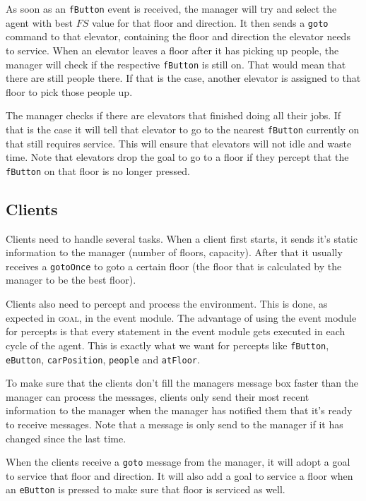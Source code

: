 \documentclass[a4paper,10pt,twocolumn]{article}
\begin{document}
As soon as an \texttt{fButton} event is received, the manager will try and select the agent with best $FS$ value for that floor and direction. It then sends a \texttt{goto} command to that elevator, containing the floor and direction the elevator needs to service. When an elevator leaves a floor after it has picking up people, the manager will check if the respective \texttt{fButton} is still on. That would mean that there are still people there. If that is the case, another elevator is assigned to that floor to pick those people up.

The manager checks if there are elevators that finished doing all their jobs. If that is the case it will tell that elevator to go to the nearest \texttt{fButton} currently on that still requires service. This will ensure that elevators will not idle and waste time. Note that elevators drop the goal to go to a floor if they percept that the \texttt{fButton} on that floor is no longer pressed.

\subsection{Clients}
Clients need to handle several tasks. When a client first starts, it sends it's static information to the manager (number of floors, capacity). After that it usually receives a \texttt{gotoOnce} to goto a certain floor (the floor that is calculated by the manager to be the best floor).

Clients also need to percept and process the environment. This is done, as expected in \textsc{goal}, in the event module. The advantage of using the event module for percepts is that every statement in the event module gets executed in each cycle of the agent. This is exactly what we want for percepts like \texttt{fButton}, \texttt{eButton}, \texttt{carPosition}, \texttt{people} and \texttt{atFloor}. 

To make sure that the clients don't fill the managers message box faster than the manager can process the messages, clients only send their most recent information to the manager when the manager has notified them that it's ready to receive messages. Note that a message is only send to the manager if it has changed since the last time.

When the clients receive a \texttt{goto} message from the manager, it will adopt a goal to service that floor and direction. It will also add a goal to service a floor when an \texttt{eButton} is pressed to make sure that floor is serviced as well.
\end{document}
